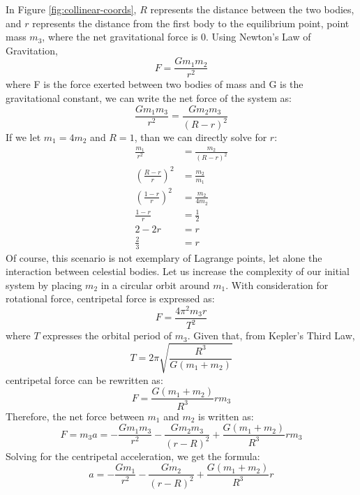 In Figure \ref{fig:collinear-coords}, $R$ represents the distance between the two bodies, and $r$ represents the distance from the first body to the equilibrium point, point mass $m_3$, where the net gravitational force is 0. Using Newton's Law of Gravitation,
\begin{equation*}
	F = \frac{Gm_1m_2}{r^2}
\end{equation*}
where F is the force exerted between two bodies of mass and G is the gravitational constant, we can write the net force of the system as:
\begin{equation*}
	\frac{Gm_1m_3}{r^2} = \frac{Gm_2m_3}{(R - r)^2}
\end{equation*}
If we let $m_1 = 4m_2$ and $R = 1$, than we can directly solve for $r$:
\begin{align*}
	\frac{m_1}{r^2} &= \frac{m_2}{(R - r)^2} \\
	\left(\frac{R - r}{r}\right)^2 &= \frac{m_2}{m_1} \\
	\left(\frac{1 - r}{r}\right)^2 &= \frac{m_2}{4m_2} \\
	\frac{1 - r}{r} &= \frac{1}{2} \\
	2 - 2r &= r \\
	\frac{2}{3} &= r
\end{align*}
Of course, this scenario is not exemplary of Lagrange points, let alone the interaction between celestial bodies. Let us increase the complexity of our initial system by placing $m_2$ in a circular orbit around $m_1$. With consideration for rotational force, centripetal force is expressed as:
\begin{equation*}
	F = \frac{4\pi^2m_3r}{T^2}
\end{equation*}
where $T$ expresses the orbital period of $m_3$. Given that, from Kepler's Third Law,
\begin{equation*}
	T = 2\pi \sqrt{\frac{R^3}{G(m_1 + m_2)}}
\end{equation*}
centripetal force can be rewritten as:
\begin{equation*}
	F = \frac{G(m_1+m_2)}{R^3}rm_3
\end{equation*}
Therefore, the net force between $m_1$ and $m_2$ is written as:
\begin{equation*}
	F = m_3a = -\frac{Gm_1m_3}{r^2} - \frac{Gm_2m_3}{(r - R)^2} + \frac{G(m_1+m_2)}{R^3}rm_3
\end{equation*}
Solving for the centripetal acceleration, we get the formula:
\begin{equation*}
	a = -\frac{Gm_1}{r^2} - \frac{Gm_2}{(r - R)^2} + \frac{G(m_1+m_2)}{R^3}r
\end{equation*}
